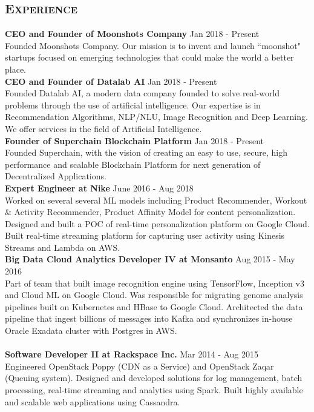 \begin{resume}
\section{\textsc{Experience}}
\textbf{CEO and Founder of Moonshots Company} \hfill Jan 2018 - Present\\
Founded Moonshots Company. Our mission is to invent and launch ``moonshot" startups focused on emerging technologies that could make the world a better place.\\
\textbf{CEO and Founder of Datalab AI} \hfill Jan 2018 - Present\\
Founded Datalab AI, a modern data company founded to solve real-world problems through the use of artificial intelligence. Our expertise is in Recommendation Algorithms, NLP/NLU, Image Recognition and Deep Learning. We offer services in the field of Artificial Intelligence. \\
\textbf{Founder of Superchain Blockchain Platform} \hfill Jan 2018 - Present\\
Founded Superchain, with the vision of creating an easy to use, secure, high performance and scalable Blockchain Platform for next generation of Decentralized Applications.\\
\textbf{Expert Engineer at Nike} \hfill June 2016 - Aug 2018\\
Worked on several several ML models including Product Recommender, Workout \& Activity Recommender, Product Affinity Model for content personalization. Designed and built a POC of real-time personalization platform on Google Cloud. Built real-time streaming platform for capturing user activity using Kinesis Streams and Lambda on AWS.\\
\textbf{Big Data Cloud Analytics Developer IV at Monsanto} \hfill Aug 2015 - May 2016\\
Part of team that built image recognition engine using TensorFlow, Inception v3 and Cloud ML on Google Cloud. Was responsible for migrating genome analysis pipelines built on Kubernetes and HBase to Google Cloud. Architected the data pipeline that ingest billions of messages into Kafka and synchronizes in-house Oracle Exadata cluster with Postgres in AWS.\\ \\
\textbf{Software Developer II at Rackspace Inc.} \hfill Mar 2014 - Aug 2015\\
Engineered OpenStack Poppy (CDN as a Service) and OpenStack Zaqar (Queuing system). Designed and developed solutions for log management, batch processing, real-time streaming and analytics using Spark. Built highly available and scalable web applications using Cassandra.\\

\end{resume}
